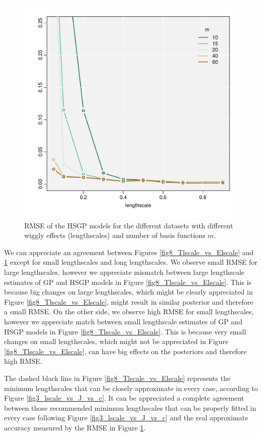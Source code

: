 \documentclass[]{interact}
\theoremstyle{plain}%
\theoremstyle{definition}
\theoremstyle{remark}
\begin{document}
\begin{figure}
\centering
\includegraphics[scale=0.45]{fig9_MSE_varing_lscale.pdf}
\caption{RMSE of the HSGP models for the different datasets with different wiggly effects (lengthscales) and number of basis functions $m$.}
  \label{fig9_MSE_varing_lscale}
\end{figure}

We can appreciate an agreement between Figures \ref{fig8_Tlscale_vs_Elscale} and \ref{fig9_MSE_varing_lscale} except for small lengthscales and long lengthscales. We observe small RMSE for large lengthscales, however we appreciate mismatch between large lengthscale estimates of GP and HSGP models in Figure \ref{fig8_Tlscale_vs_Elscale}. This is because big changes on large lengthscales, which might be clearly appreciated in Figure \ref{fig8_Tlscale_vs_Elscale}, might result in similar posterior and therefore a small RMSE. On the other side, we observe high RMSE for small lengthscales, however we appreciate match between small lengthscale estimates of GP and HSGP models in Figure \ref{fig8_Tlscale_vs_Elscale}. This is because very small changes on small lengthscales, which might not be appreciated in Figure \ref{fig8_Tlscale_vs_Elscale}, can have big effects on the posteriors and therefore high RMSE.

The dashed black line in Figure \ref{fig8_Tlscale_vs_Elscale} represents the minimum lengthscales that can be closely approximate in every case, according to Figure \ref{fig3_lscale_vs_J_vs_c}. It can be appreciated a complete agreement between those recommended minimum lengthscales that can be properly fitted in every case following Figure \ref{fig3_lscale_vs_J_vs_c} and the real approximate accuracy measured by the RMSE in Figure \ref{fig9_MSE_varing_lscale}.
\end{document}
